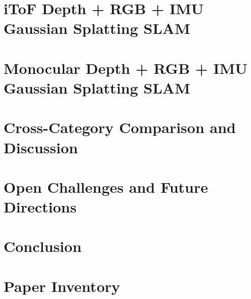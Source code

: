 \documentclass[10pt,a4paper]{article}
\begin{document}
\section{iToF Depth + RGB + IMU Gaussian Splatting SLAM}
\label{sec:itof}


\section{Monocular Depth + RGB + IMU Gaussian Splatting SLAM}
\label{sec:monodepth}


\section{Cross-Category Comparison and Discussion}
\label{sec:comparison}


\section{Open Challenges and Future Directions}
\label{sec:future}


\section{Conclusion}
\label{sec:conclusion}





\appendix
\section{Paper Inventory}
\label{sec:inventory}

\end{document}

